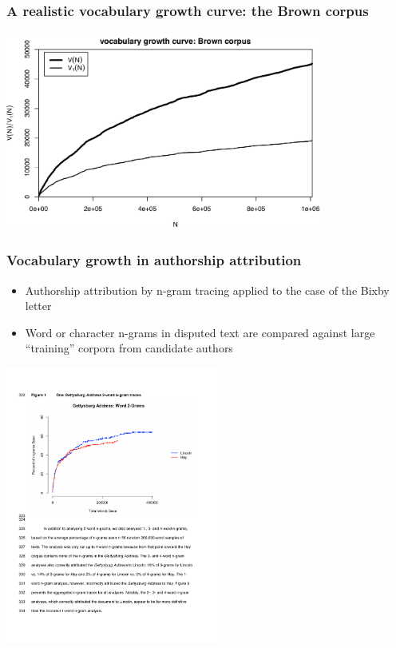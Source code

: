\documentclass[handout,notes=show,t]{beamer} %
\begin{document}
\begin{frame}
  \frametitle{A realistic vocabulary growth curve: the Brown corpus}

  \ungap[1]
  \begin{center}
    \includegraphics[height=6.5cm]{../plots/tutorial_brown_vgc}%
  \end{center}
\end{frame}

\begin{frame}
  \frametitle{Vocabulary growth in authorship attribution}

  \begin{itemize}
  \item Authorship attribution by n-gram tracing applied to the case of the Bixby letter \citep{Grieve:etc:18}
  \item Word or character n-grams in disputed text are compared against large ``training'' corpora from candidate authors
  \end{itemize}

  \begin{center}
    \includegraphics[width=7cm]{img/GrieveEtc2018_fig1}
  \end{center}
\end{frame}
\end{document}
